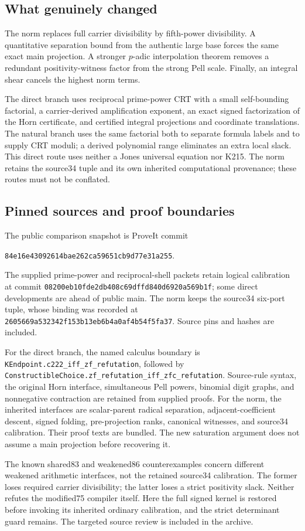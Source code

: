 \documentclass[11pt,a4paper]{article}
\theoremstyle{remark}\newtheorem{remark}[theorem]{Remark}
\begin{document}
\subsection{What genuinely changed}
The norm replaces full carrier divisibility by fifth-power divisibility. A quantitative separation bound from the authentic large base forces the same exact main projection. A stronger $p$-adic interpolation theorem removes a redundant positivity-witness factor from the strong Pell scale. Finally, an integral shear cancels the highest norm terms.

The direct branch uses reciprocal prime-power CRT with a small self-bounding factorial, a carrier-derived amplification exponent, an exact signed factorization of the Horn certificate, and certified integral projections and coordinate translations. The natural branch uses the same factorial both to separate formula labels and to supply CRT moduli; a derived polynomial range eliminates an extra local slack. This direct route uses neither a Jones universal equation nor K215. The norm retains the source34 tuple and its own inherited computational provenance; these routes must not be conflated.

\subsection{Pinned sources and proof boundaries}\label{sec:boundaries}
The public comparison snapshot is ProveIt commit
\begin{center}\small\texttt{84e16e43092614bae262ca59651cb9d77e31a255}.\end{center}
The supplied prime-power and reciprocal-shell packets retain logical calibration at commit \texttt{08200eb10fde2db408c69dffd840d6920a569b1f}; some direct developments are ahead of public main. The norm keeps the source34 six-port tuple, whose binding was recorded at \texttt{2605669a532342f153b13eb6b4a0af4b54f5fa37}. Source pins and hashes are included.

For the direct branch, the named calculus boundary is
\texttt{KEndpoint.c222\_iff\_zf\_refutation}, followed by
\texttt{ConstructibleChoice.zf\_refutation\_iff\_zfc\_refutation}.
Source-rule syntax, the original Horn interface, simultaneous Pell powers, binomial digit graphs, and nonnegative contraction are retained from supplied proofs. For the norm, the inherited interfaces are scalar-parent radical separation, adjacent-coefficient descent, signed folding, pre-projection ranks, canonical witnesses, and source34 calibration. Their proof texts are bundled. The new saturation argument does not assume a main projection before recovering it.

The known shared83 and weakened86 counterexamples concern different weakened arithmetic interfaces, not the retained source34 calibration. The former loses required carrier divisibility; the latter loses a strict positivity slack. Neither refutes the modified75 compiler itself. Here the full signed kernel is restored before invoking its inherited ordinary calibration, and the strict determinant guard remains. The targeted source review is included in the archive.






\end{document}

